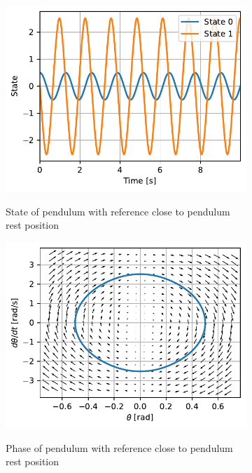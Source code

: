 \documentclass{cmc}
\begin{document}

\begin{figure}[H]
  \centering
  \begin{subfigure}[b]{0.49\textwidth}
    {
      \includegraphics[width=\textwidth]{figures/State_Spring_Reference_1(x0_=_[0dot5,_0dot1]).pdf}
    }
    \caption{State of pendulum with reference close to pendulum rest
      position}
    \label{fig:state-pendulum-spring-reference-1}
  \end{subfigure}
  \begin{subfigure}[b]{0.49\textwidth}
    { \centering
      \includegraphics[width=\textwidth]{figures/Phase_Spring_Reference_1(x0_=_[0dot5,_0dot1]).pdf}
    }
    \caption{Phase of pendulum with reference close to pendulum rest
      position}
    \label{fig:phase-pendulum-spring-reference-1}
  \end{subfigure}
  \caption{}
  \label{fig:pendulum-spring-reference-1}
\end{figure}
\end{document}
